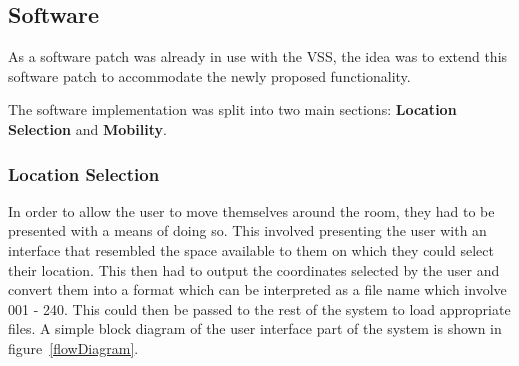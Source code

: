 \documentclass[../../main.tex]{subfiles}
\begin{document}
	\subsection{Software}
		
		As a software patch was already in use with the \ac{VSS}, the idea was to extend this software patch to accommodate the newly proposed functionality.

		The software implementation was split into two main sections: \textbf{Location Selection} and \textbf{Mobility}.

		\subsubsection{Location Selection}

			In order to allow the user to move themselves around the room, they had to be presented with a means of doing so. This involved presenting the user with an interface that resembled the space available to them on which they could select their location. This then had to output the coordinates selected by the user and convert them into a format which can be interpreted as a file name which involve 001 - 240. This could then be passed to the rest of the system to load appropriate files. A simple block diagram of the user interface part of the system is shown in figure~\ref{flowDiagram}.
\end{document}
